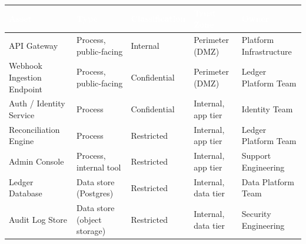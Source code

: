 \begin{center}
\begin{tabularx}{\linewidth}{@{}l L l l l@{}}
\toprule
{}
\textcolor{white}{\textbf{Asset}} & \textcolor{white}{\textbf{Type}} & \textcolor{white}{\textbf{Classification}} & \textcolor{white}{\textbf{Trust Zone}} & \textcolor{white}{\textbf{Owner}} \\
\midrule
API Gateway & Process, public-facing & Internal & Perimeter (DMZ) & Platform Infrastructure \\
Webhook Ingestion Endpoint & Process, public-facing & Confidential & Perimeter (DMZ) & Ledger Platform Team \\
Auth / Identity Service & Process & Confidential & Internal, app tier & Identity Team \\
Reconciliation Engine & Process & Restricted & Internal, app tier & Ledger Platform Team \\
Admin Console & Process, internal tool & Restricted & Internal, app tier & Support Engineering \\
Ledger Database & Data store (Postgres) & Restricted & Internal, data tier & Data Platform Team \\
Audit Log Store & Data store (object storage) & Restricted & Internal, data tier & Security Engineering \\
\bottomrule
\end{tabularx}
\label{tab:assets}
\end{center}
